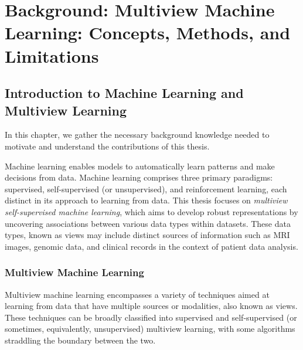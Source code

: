 \graphicspath{{chapters/background/}}


\chapter{Background: Multiview Machine Learning: Concepts, Methods, and Limitations}\label{chap:background}
\minitoc


\section{Introduction to Machine Learning and Multiview Learning}

In this chapter, we gather the necessary background knowledge needed to motivate and understand the contributions of this thesis.

Machine learning enables models to automatically learn patterns and make decisions from data.
Machine learning comprises three primary paradigms: supervised, self-supervised (or unsupervised), and reinforcement learning, each distinct in its approach to learning from data.
This thesis focuses on \textit{multiview self-supervised machine learning}, which aims to develop robust representations by uncovering associations between various data types within datasets.
These data types, known as \gls{views} may include distinct sources of information such as MRI images, genomic data, and clinical records in the context of patient data analysis.

\subsection{Multiview Machine Learning}

Multiview machine learning encompasses a variety of techniques aimed at learning from data that have multiple sources or modalities, also known as \gls{views}.
These techniques can be broadly classified into supervised and self-supervised (or sometimes, equivalently, unsupervised) multiview learning, with some algorithms straddling the boundary between the two.

